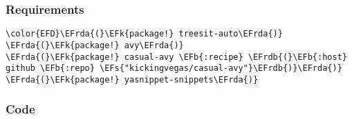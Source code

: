 \documentclass[a4wide,10pt]{article}
\newcommand{\EFs}[1]{\textcolor{EFs}{#1}} %
\newcommand{\EFk}[1]{\textcolor{EFk}{#1}} %
\newcommand{\EFb}[1]{\textcolor{EFb}{#1}} %
\newcommand{\EFrda}[1]{\textcolor{EFrda}{#1}} %
\newcommand{\EFrdb}[1]{\textcolor{EFrdb}{#1}} %
\begin{document}
\subsubsection{Requirements}
\label{sec:org9a79eb3}
\begin{Code}
\begin{Verbatim}
\color{EFD}\EFrda{(}\EFk{package!} treesit-auto\EFrda{)}
\EFrda{(}\EFk{package!} avy\EFrda{)}
\EFrda{(}\EFk{package!} casual-avy \EFb{:recipe} \EFrdb{(}\EFb{:host} github \EFb{:repo} \EFs{"kickingvegas/casual-avy"}\EFrdb{)}\EFrda{)}
\EFrda{(}\EFk{package!} yasnippet-snippets\EFrda{)}
\end{Verbatim}
\end{Code}
\subsubsection{Code}
\label{sec:org4a5d02d}
\end{document}
